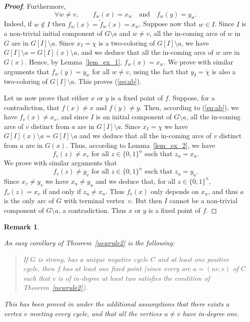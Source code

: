 \documentclass[11pt,a4paper]{article}
\newtheorem{remark}{Remark}
\def\B{\{0,1\}}
\def\e{\epsilon}
\begin{document}
\begin{proof}[{\bf Proof}]
\medskip
Furthermore, 
\begin{equation}\label{eq:ab}
\forall w\neq v,\qquad f_w(x)=x_w\quad\text{and}\quad f_w(y)=y_w.
\end{equation}
Indeed, if $w\notin I$ then $f_w(x)=\tilde f_w(x)=x_w$. Suppose now that $w\in I$. Since $I$ is a non-trivial initial component of $G\setminus a$ and $w\neq v$, all the in-coming arcs of $w$ in $G$ are in $G[I]\setminus a$. Since $x_I=\chi$ is a two-coloring of $G[I]\setminus a$, we have $G[I]\setminus a=G[I](x)\setminus a$, and we deduce that all the in-coming arcs of $w$ are in $G(x)$. Hence, by Lemma~\ref{lem_ex_1}, $f_w(x)=x_w$. We prove with similar arguments that $f_w(y)=y_w$ for all $w\neq v$, using the fact that $y_I=\overline{\chi}$ is also a two-coloring of $G[I]\setminus a$. This proves (\ref{eq:ab}). 

\medskip
Let us now prove that either $x$ or $y$ is a fixed point of $f$. Suppose, for a contradiction, that $f(x)\neq x$ and $f(y)\neq y$. Then, according to (\ref{eq:ab}), we have $f_v(x)\neq x_v$, and since $I$ is an initial component of $G\setminus a$, all the in-coming arcs of $v$ distinct from $a$ are in $G[I]\setminus a$. Since $x_I=\chi$ we have $G[I](x)\setminus a=G[I]\setminus a$ and we deduce that all the in-coming arcs of $v$ distinct from $a$ are in $G(x)$. Thus, according to Lemma~\ref{lem_ex_2}, we have 
\[
f_v(z)\neq x_v\text{ for all $z\in\B^n$ such that $z_u=x_u$}. 
\]
We prove with similar arguments that 
\[
f_v(z)\neq y_v\text{ for all $z\in\B^n$ such that $z_u=y_u$}. 
\]
Since $x_v\neq y_v$ we have $x_u\neq y_u$ and we deduce that, for all $z\in\B^n$, $f_v(z)=x_v$ if and only if $z_u\neq x_u$. Thus $f_v(x)$ only depends on $x_u$, and thus $a$ is the only arc of $G$ with terminal vertex~$v$. But then $I$ cannot be a non-trivial component of $G\setminus a$, a contradiction. Thus $x$ or $y$ is a fixed point of $f$. 
\end{proof}

\begin{remark}\label{rem:DR2}
{\em An easy corollary of Theorem~\ref{newrule2} is the following: 
\begin{quote}
{\em If $G$ is strong, has a unique negative cycle $C$ and at least one positive cycle, then $f$ has at least one fixed point} (since every arc $a=(uv,\e)$ of $C$ such that $v$ is of in-degree at least two satisfies the condition of Theorem~\ref{newrule2}).
\end{quote}
This has been proved in \cite{DR12} under the additional assumptions that there exists a vertex $v$ meeting every cycle, and that all the vertices $u\neq v$ have in-degree one.}
\end{remark}
\end{document}
